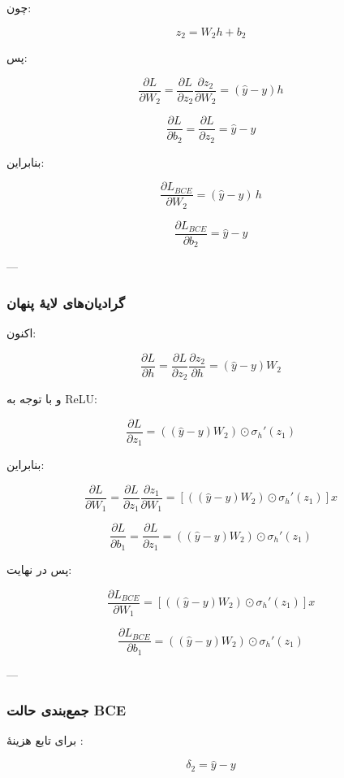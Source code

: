 \documentclass[12pt,a4paper]{article}
\begin{document}
چون:

\[
z_2=W_2h+b_2
\]

پس:

\[
\frac{\partial L}{\partial W_2}
=
\frac{\partial L}{\partial z_2}
\frac{\partial z_2}{\partial W_2}
=
(\hat{y}-y)h
\]

\[
\frac{\partial L}{\partial b_2}
=
\frac{\partial L}{\partial z_2}
=
\hat{y}-y
\]

بنابراین:

\[
\boxed{
	\frac{\partial L_{BCE}}{\partial W_2}
	=
	(\hat{y}-y)\,h
}
\]

\[
\boxed{
	\frac{\partial L_{BCE}}{\partial b_2}
	=
	\hat{y}-y
}
\]

---

\subsubsection{گرادیان‌های لایهٔ پنهان}

اکنون:

\[
\frac{\partial L}{\partial h}
=
\frac{\partial L}{\partial z_2}\frac{\partial z_2}{\partial h}
=
(\hat{y}-y)W_2
\]

و با توجه به ReLU:

\[
\frac{\partial L}{\partial z_1}
=
\left((\hat{y}-y)W_2\right)\odot \sigma_h'(z_1)
\]

بنابراین:

\[
\frac{\partial L}{\partial W_1}
=
\frac{\partial L}{\partial z_1}\frac{\partial z_1}{\partial W_1}
=
\left[\left((\hat{y}-y)W_2\right)\odot \sigma_h'(z_1)\right]x
\]

\[
\frac{\partial L}{\partial b_1}
=
\frac{\partial L}{\partial z_1}
=
\left((\hat{y}-y)W_2\right)\odot \sigma_h'(z_1)
\]

پس در نهایت:

\[
\boxed{
	\frac{\partial L_{BCE}}{\partial W_1}
	=
	\left[\left((\hat{y}-y)W_2\right)\odot \sigma_h'(z_1)\right]x
}
\]

\[
\boxed{
	\frac{\partial L_{BCE}}{\partial b_1}
	=
	\left((\hat{y}-y)W_2\right)\odot \sigma_h'(z_1)
}
\]

---

\subsubsection{جمع‌بندی حالت BCE}

برای تابع هزینهٔ :

\[
\delta_2 = \hat{y}-y
\]
\end{document}
